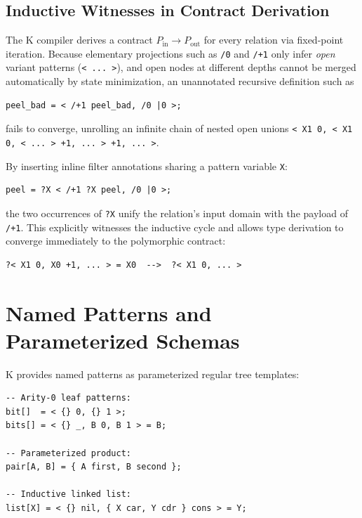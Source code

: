 \documentclass[11pt,a4paper]{article}
\begin{document}
\subsection{Inductive Witnesses in Contract Derivation}

The K compiler derives a contract $P_{\text{in}} \to P_{\text{out}}$ for every relation via fixed-point iteration. Because elementary projections such as \lstinline|/0| and \lstinline|/+1| only infer \emph{open} variant patterns (\lstinline|< ... >|), and open nodes at different depths cannot be merged automatically by state minimization, an unannotated recursive definition such as
\begin{lstlisting}[language=k]
peel_bad = < /+1 peel_bad, /0 |0 >;
\end{lstlisting}
fails to converge, unrolling an infinite chain of nested open unions \lstinline|< X1 0, < X1 0, < ... > +1, ... > +1, ... >|.

By inserting inline filter annotations sharing a pattern variable \lstinline|X|:
\begin{lstlisting}[language=k]
peel = ?X < /+1 ?X peel, /0 |0 >;
\end{lstlisting}
the two occurrences of \lstinline|?X| unify the relation's input domain with the payload of \lstinline|/+1|. This explicitly witnesses the inductive cycle and allows type derivation to converge immediately to the polymorphic contract:
\begin{lstlisting}[language=k]
?< X1 0, X0 +1, ... > = X0  -->  ?< X1 0, ... >
\end{lstlisting}

\section{Named Patterns and Parameterized Schemas}

K provides named patterns as parameterized regular tree templates:

\begin{lstlisting}[language=k]
-- Arity-0 leaf patterns:
bit[]  = < {} 0, {} 1 >;
bits[] = < {} _, B 0, B 1 > = B;

-- Parameterized product:
pair[A, B] = { A first, B second };

-- Inductive linked list:
list[X] = < {} nil, { X car, Y cdr } cons > = Y;
\end{lstlisting}
\end{document}
